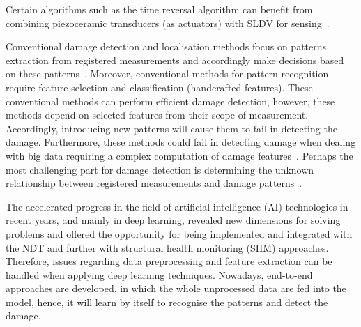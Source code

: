 \documentclass[preprint,9pt]{elsarticle}
\begin{document}
Certain algorithms such as the time reversal algorithm can benefit from combining piezoceramic transducers (as actuators) with SLDV for sensing~\cite{Girolamo2018a, Miniaci2019}.
    
Conventional damage detection and localisation methods focus on patterns extraction from registered measurements and accordingly make decisions based on these patterns~\cite{Gul2009}. 
Moreover, conventional methods for pattern recognition require feature selection and classification (handcrafted features). 
These conventional methods can perform efficient damage detection, however, these methods depend on selected features from their scope of measurement.
Accordingly, introducing new patterns will cause them to fail in detecting the damage.
Furthermore, these methods could fail in detecting damage when dealing with big data requiring a complex computation of damage features~\cite{Gulgec2019}.
Perhaps the most challenging part for damage detection is determining the unknown relationship between registered measurements and damage patterns~\cite{Gulgec2019}. 
    
The accelerated progress in the field of artificial intelligence (AI) technologies in recent years, and mainly in deep learning, revealed new dimensions for solving problems and offered the opportunity for being implemented and integrated with the NDT and further with structural health monitoring (SHM) approaches.
Therefore, issues regarding data preprocessing and feature extraction can be handled when applying deep learning techniques. 
Nowadays, end-to-end approaches are developed, in which the whole unprocessed data are fed into the model, hence, it will learn by itself to recognise the patterns and detect the damage.
    
\end{document}
